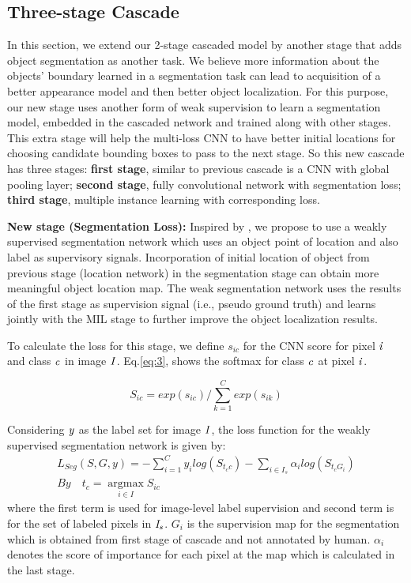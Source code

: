\documentclass[10pt,twocolumn,letterpaper]{article}
\newcommand{\argmax}{\mathop{\mathrm{argmax}}\limits}   \newcommand{\Lb}{\pazocal{L}}
\begin{document}
\subsection{Three-stage Cascade}
In this section, we extend our 2-stage cascaded model by another stage that adds object segmentation as another task. We believe more information about the objects' boundary learned in a segmentation task can lead to acquisition of a better appearance model and then better object localization. For this purpose, our new stage uses another form of weak supervision to learn a segmentation model, embedded in the cascaded network and trained along with other stages. This extra stage will help the multi-loss CNN to have better initial locations for choosing candidate bounding boxes to pass to the next stage. So this new cascade has three stages: \textbf{first stage}, similar to previous cascade is a CNN with global pooling layer; \textbf{second stage}, fully convolutional network with segmentation loss; \textbf{third stage}, multiple instance learning with corresponding loss.

\textbf{New stage (Segmentation Loss):} Inspired by \cite{pointwise, weakSeg}, we propose to use a weakly supervised segmentation network which uses an object point of location and also label as supervisory signals. Incorporation of initial location of object from previous stage (location network) in the segmentation stage can obtain more meaningful object location map. The weak segmentation network uses the results of the first stage as supervision signal (i.e., pseudo ground truth) and learns jointly with the MIL stage to further improve the object localization results.

To calculate the loss for this stage, we define $s_{ic}$ for the CNN score for pixel $\it{i}$ and class $\it{c}$ in image $\it{I}$. Eq.\ref{eq:3}, shows the softmax for class $\it{c}$ at pixel $\it{i}$.

\begin{equation}
S_{ic}={exp(s_{ic})}/{\sum_{{k=1}}^C exp(s_{ik})}
\label{eq:3}
\end{equation}

Considering $\it{y}$ as the label set for image $\it{I}$, the loss function for the weakly supervised segmentation network is given by:
\begin{equation}
\begin{split}
L_{Seg}(S,G,y)=-\sum_{{i=1}}^C y_{i} log(S_{t_{c}c})-{\sum_{i \in I_{s}}\alpha_{i} log(S_{t_{c}G_{i}})}\\
By\quad t_{c}=\argmax_{i \in I}{S_{ic}}\qquad \qquad \quad \qquad
\end{split}
\label{eq:4}
\end{equation}
\noindent where the first term is used for image-level label supervision and second term is for the set of labeled pixels in $\it{I_{s}}$. ${G_{i}}$ is the supervision map for the segmentation which is obtained from first stage of cascade and not annotated by human. $\alpha_{i}$ denotes the score of importance for each pixel at the map which is calculated in the last stage.
\end{document}
